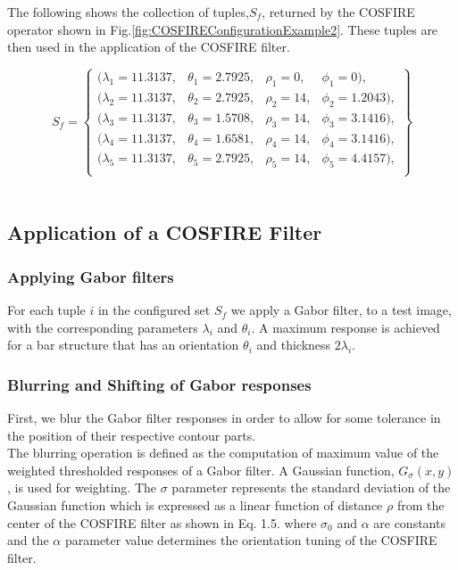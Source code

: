 The following shows the collection of tuples,$S_{f}$, returned by the COSFIRE operator shown in Fig.\ref{fig:COSFIREConfigurationExample2}. These tuples are then used in the application of the COSFIRE filter.

\begin{equation}
  S_{f} = \begin{Bmatrix*} 
                  (\lambda_1 = 11.3137, & \theta_1 = 2.7925,    & \rho_1 = 0,  & \phi_1 = 0), \\
                  (\lambda_2 = 11.3137, & \theta_2 = 2.7925,    & \rho_2 = 14, &\phi_2 = 1.2043), \\
                  (\lambda_3 = 11.3137, & \theta_3 = 1.5708,    & \rho_3 = 14, &\phi_3 = 3.1416), \\
                  (\lambda_4 = 11.3137, & \theta_4 = 1.6581,    & \rho_4 = 14, &\phi_4 = 3.1416), \\
                  (\lambda_5 = 11.3137, & \theta_5 = 2.7925,    & \rho_5 = 14, &\phi_5 = 4.4157), \\
              \end{Bmatrix*}
\end{equation} \\

\subsection{Application of a COSFIRE Filter}
\subsubsection{Applying Gabor filters}
For each tuple $i$ in the configured set $S_f$ we apply a Gabor filter, to a test image, with the corresponding parameters $\lambda_i$ and $\theta_i$. A maximum response is achieved for a bar structure that has an orientation $\theta_i$ and thickness $2\lambda_i.$ 

\subsubsection{Blurring and Shifting of Gabor responses}
First, we blur the Gabor filter responses in order to allow for some tolerance in the position of their respective contour parts. \\

The blurring operation is defined as the computation of maximum value of the weighted thresholded responses of a Gabor filter. A Gaussian function, $G_{\sigma}(x,y)$, is used for weighting. The $\sigma$ parameter represents the standard deviation of the Gaussian function which is expressed as a linear function of distance $\rho$ from the center of the COSFIRE filter as shown in Eq. 1.5. where $\sigma_{0}$ and $\alpha$ are constants and the $\alpha$ parameter value determines the orientation tuning of the COSFIRE filter.

